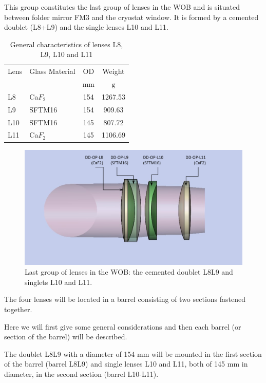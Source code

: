 \documentclass{report}
\newcommand{\unit}[1]{\ensuremath{\mathrm{#1}}}
\begin{document}
This group constitutes the last group of lenses in the WOB and is situated between folder mirror FM3 and the cryostat window. It is formed by a cemented doublet (L8+L9) and the single lenses L10 and L11. 

\begin{table}
\caption{General characteristics of lenses L8, L9, L10 and L11}
\label{table:L8-L11}
\begin{center}
\small
\begin{tabular}{llcc}
\hline
\hline
Lens	&	Glass Material	&	OD	&	Weight	\\
	&		&	\unit{mm}	& \unit{g}	\\
\hline
L8	&	Ca$F_2$	&	154	&	1267.53	\\
L9	&	SFTM16	&	154	&	909.63	\\
L10	&	SFTM16	&	145	&	807.72	\\
L11	&	Ca$F_2$	&	145	&	1106.69	\\
\hline
\end{tabular}
\end{center}
\end{table}

\begin{figure}
\begin{center}
\includegraphics[width=0.9\linewidth]{figures/DD-OP-L89L10L11.png}
\end{center}
\caption{Last group of lenses in the WOB: the cemented doublet L8L9 and singlets L10 and L11.}
\label{figure:WOB-OP-L8L11}
\end{figure}

The four lenses will be located in a barrel consisting of two sections fastened together.

Here we will first give some general considerations and then each barrel (or section of the barrel) will be described.

The doublet L8L9 with a diameter of 154 mm will be mounted in the first section of the barrel (barrel L8L9) and single lenses L10 and L11, both of 145 mm in diameter, in the second section (barrel L10-L11).
\end{document}
